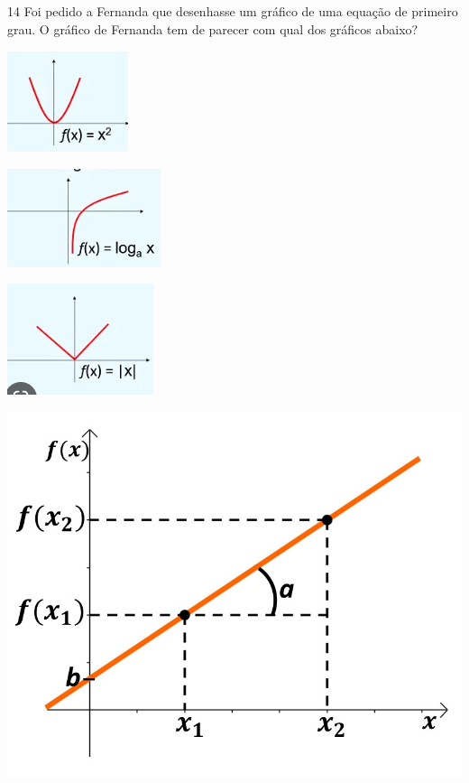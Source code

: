 
\num{14} Foi pedido a Fernanda que desenhasse um gráfico de uma equação de
primeiro grau. O gráfico de Fernanda tem de parecer com qual dos
gráficos abaixo?

\begin{escolha}
\item \includegraphics{./imgSAEB_7_MAT/media/image102.png}
\item \includegraphics{./imgSAEB_7_MAT/media/image103.png}
\item \includegraphics{./imgSAEB_7_MAT/media/image104.png}
\item \includegraphics{./imgSAEB_7_MAT/media/image105.png}
\end{escolha}


